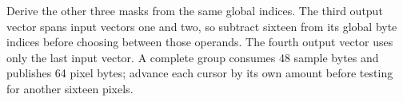Derive the other three masks from the same global indices. The third output vector
spans input vectors one and two, so subtract sixteen from its global byte indices
before choosing between those operands. The fourth output vector uses only the last
input vector. A complete group consumes 48 sample bytes and publishes 64 pixel bytes;
advance each cursor by its own amount before testing for another sixteen pixels.

